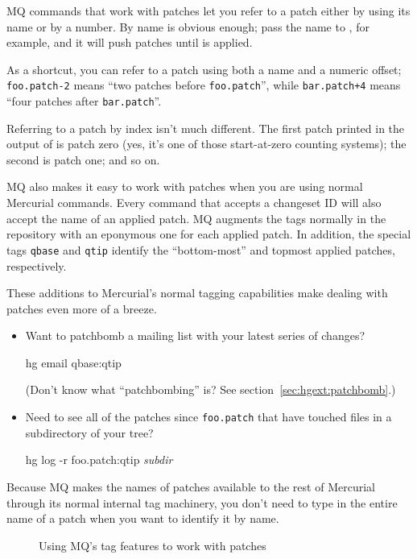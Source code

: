 MQ commands that work with patches let you refer to a patch either by
using its name or by a number.  By name is obvious enough; pass the
name  to , for example, and it will
push patches until  is applied.  

As a shortcut, you can refer to a patch using both a name and a
numeric offset; \texttt{foo.patch-2} means ``two patches before
\texttt{foo.patch}'', while \texttt{bar.patch+4} means ``four patches
after \texttt{bar.patch}''.

Referring to a patch by index isn't much different.  The first patch
printed in the output of  is patch zero (yes, it's one
of those start-at-zero counting systems); the second is patch one; and
so on.

MQ also makes it easy to work with patches when you are using normal
Mercurial commands.  Every command that accepts a changeset ID will
also accept the name of an applied patch.  MQ augments the tags
normally in the repository with an eponymous one for each applied
patch.  In addition, the special tags \texttt{qbase} and \texttt{qtip} identify the ``bottom-most'' and
topmost applied patches, respectively.

These additions to Mercurial's normal tagging capabilities make
dealing with patches even more of a breeze.
\begin{itemize}
\item Want to patchbomb a mailing list with your latest series of
  changes?
  \begin{codesample4}
    hg email qbase:qtip
  \end{codesample4}
  (Don't know what ``patchbombing'' is?  See
  section~\ref{sec:hgext:patchbomb}.)
\item Need to see all of the patches since \texttt{foo.patch} that
  have touched files in a subdirectory of your tree?
  \begin{codesample4}
    hg log -r foo.patch:qtip \emph{subdir}
  \end{codesample4}
\end{itemize}

Because MQ makes the names of patches available to the rest of
Mercurial through its normal internal tag machinery, you don't need to
type in the entire name of a patch when you want to identify it by
name.

\begin{figure}[ht]
  \caption{Using MQ's tag features to work with patches}
  \label{ex:mq:id}
\end{figure}

